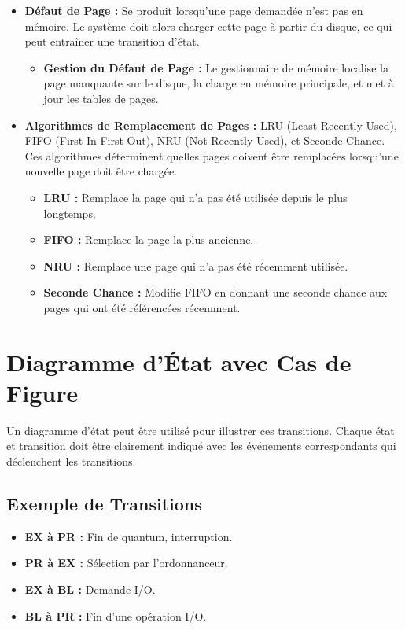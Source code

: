 \begin{itemize}
    \item \textbf{Défaut de Page :} Se produit lorsqu'une page demandée n'est pas en mémoire. Le système doit alors charger cette page à partir du disque, ce qui peut entraîner une transition d'état.
    \begin{itemize}
        \item \textbf{Gestion du Défaut de Page :} Le gestionnaire de mémoire localise la page manquante sur le disque, la charge en mémoire principale, et met à jour les tables de pages.
    \end{itemize}
    \item \textbf{Algorithmes de Remplacement de Pages :} LRU (Least Recently Used), FIFO (First In First Out), NRU (Not Recently Used), et Seconde Chance. Ces algorithmes déterminent quelles pages doivent être remplacées lorsqu'une nouvelle page doit être chargée.
    \begin{itemize}
        \item \textbf{LRU :} Remplace la page qui n'a pas été utilisée depuis le plus longtemps.
        \item \textbf{FIFO :} Remplace la page la plus ancienne.
        \item \textbf{NRU :} Remplace une page qui n'a pas été récemment utilisée.
        \item \textbf{Seconde Chance :} Modifie FIFO en donnant une seconde chance aux pages qui ont été référencées récemment.
    \end{itemize}
\end{itemize}

\section*{Diagramme d'État avec Cas de Figure}

Un diagramme d'état peut être utilisé pour illustrer ces transitions. Chaque état et transition doit être clairement indiqué avec les événements correspondants qui déclenchent les transitions.

\subsection*{Exemple de Transitions}

\begin{itemize}
    \item \textbf{EX à PR :} Fin de quantum, interruption.
    \item \textbf{PR à EX :} Sélection par l'ordonnanceur.
    \item \textbf{EX à BL :} Demande I/O.
    \item \textbf{BL à PR :} Fin d'une opération I/O.
\end{itemize}

